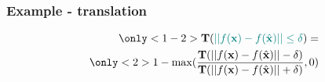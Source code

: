 \documentclass[t,compress,aspectratio=169]{beamer}
\newcommand{\translation}{\mathbf{T}}
\newcommand{\coloured}[1]{\textcolor{MyColour}{#1}}
\begin{document}
\begin{frame}
\frametitle{Example - translation}
\begin{align*}
\only<1-2>{\large{\translation (\coloured{ || f(\x) - f(\hat{\x})|| \leq \delta}) }=}\\
\only<2>{1 - \max(\dfrac{\translation(|| f(\x) - f(\hat{\x})|| - \delta)}{\translation (|| f(\x) - f(\hat{\x})|| + \delta)},0) }
\end{align*}
\end{frame}
\end{document}
